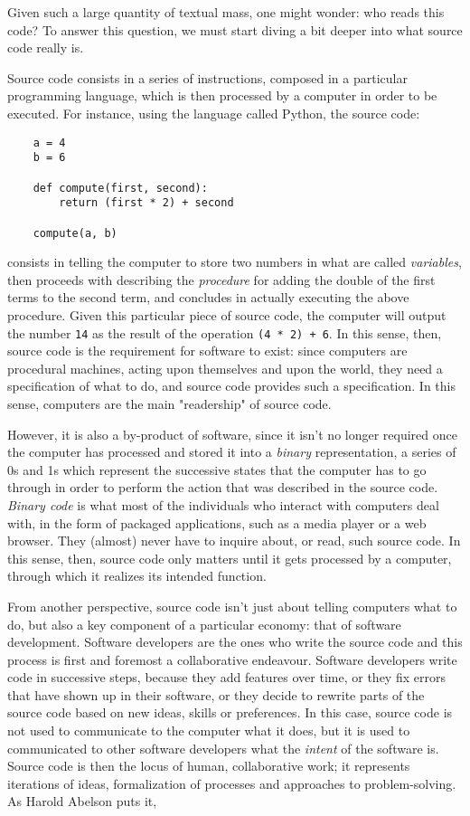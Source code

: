 Given such a large quantity of textual mass, one might wonder: who reads this code? To answer this question, we must start diving a bit deeper into what source code really is.

Source code consists in a series of instructions, composed in a particular programming language, which is then processed by a computer in order to be executed. For instance, using the language called Python, the source code:

\begin{lstlisting}
    a = 4
    b = 6

    def compute(first, second):
        return (first * 2) + second
    
    compute(a, b)
\end{lstlisting}

consists in telling the computer to store two numbers in what are called \emph{variables}, then proceeds with describing the \emph{procedure} for adding the double of the first terms to the second term, and concludes in actually executing the above procedure. Given this particular piece of source code, the computer will output the number \lstinline{14} as the result of the operation \lstinline{(4 * 2) + 6}. In this sense, then, source code is the requirement for software to exist: since computers are procedural machines, acting upon themselves and upon the world, they need a specification of what to do, and source code provides such a specification. In this sense, computers are the main "readership" of source code.

However, it is  also a by-product of software, since it isn't no longer required once the computer has processed and stored it into a \emph{binary} representation, a series of 0s and 1s which represent the successive states that the computer has to go through in order to perform the action that was described in the source code. \emph{Binary code} is what most of the individuals who interact with computers deal with, in the form of packaged applications, such as a media player or a web browser. They (almost) never have to inquire about, or read, such source code. In this sense, then, source code only matters until it gets processed by a computer, through which it realizes its intended function.

From another perspective, source code isn't just about telling computers what to do, but also a key component of a particular economy: that of software development. Software developers are the ones who write the source code and this process is first and foremost a collaborative endeavour. Software developers write code in successive steps, because they add features over time, or they fix errors that have shown up in their software, or they decide to rewrite parts of the source code based on new ideas, skills or preferences. In this case, source code is not used to communicate to the computer what it does, but it is used to communicated to other software developers what the \emph{intent} of the software is. Source code is then the locus of human, collaborative work; it represents iterations of ideas, formalization of processes and approaches to problem-solving. As Harold Abelson puts it, 

